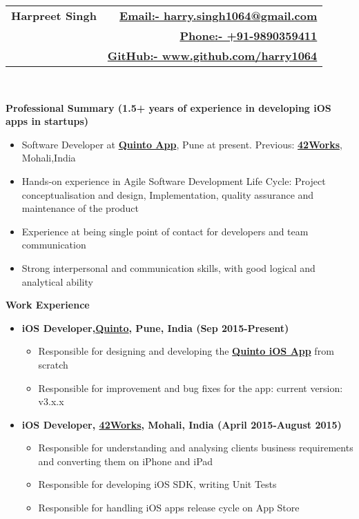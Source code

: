 \documentclass[letterpaper,11pt]{article}
\newcommand{\resitem}[1]{\item #1 \vspace{-2pt}}
\newcommand{\resheading}[1]{{\large \colorbox{mygrey}{\begin{minipage}{\textwidth}{\textbf{#1 \vphantom{p\^{E}}}}\end{minipage}}}}
\begin{document}
\newcommand{\mywebheader}{
\begin{tabular*}{7in}{l@{\extracolsep{\fill}}r}
	\textbf{\Huge \bfseries Harpreet Singh} 
	& \href{mailto:harry.singh1064@gmail.com}{\normalsize \bfseries Email:- \mdseries harry.singh1064@gmail.com}\\
	 & \href{tel:+919890359411}{\normalsize \bfseries Phone:- \mdseries +91-9890359411}\\
	 & \href{https://github.com/harry1064}{\normalsize \bfseries GitHub:- \mdseries www.github.com/harry1064}\\
	\end{tabular*}
\\}
\mywebheader

\resheading{\Large Professional Summary \normalsize \bfseries (1.5+ years of experience in developing iOS apps in startups)}
{ \footnotesize
\begin{itemize}
	\resitem{Software Developer at \href{http://quintoapp.com}{\bfseries Quinto App}, Pune at present. Previous: \href{http://42works.net/} {\bfseries  42Works}, Mohali,India }
	\resitem{Hands-on experience in Agile Software Development Life Cycle: Project conceptualisation and design, Implementation,
quality assurance and maintenance of the product}
	\resitem{Experience at being single point of contact for developers and team communication}
	\resitem{Strong interpersonal and communication skills, with good logical and analytical ability}
\end{itemize}
} %
\vspace{5mm} 
\resheading{Work Experience}
	\begin{itemize}
	\resitem {{\bfseries iOS Developer,\href{http://quintoapp.com} {Quinto}, Pune, India (Sep 2015-Present)}}
				{ \footnotesize
				\begin{itemize}
					\resitem{Responsible for designing and developing the \href{https://itunes.apple.com/in/app/id912305961}{\bfseries Quinto iOS App} from scratch}
					\resitem{Responsible for improvement and bug fixes for the app: current version: v3.x.x}
				\end{itemize}
				}
	\resitem {{\bfseries iOS Developer, \href{http://42works.net/}{\bfseries 42Works}, Mohali, India (April 2015-August 2015)}}
				{ \footnotesize
				\begin{itemize}
					\resitem{Responsible for understanding and analysing clients business requirements and converting them on iPhone and iPad}
					\resitem{Responsible for developing iOS SDK, writing Unit Tests}
					\resitem{Responsible for handling iOS apps release cycle on App Store}
				\end{itemize}
				}
\end{itemize}  %
\end{document}
